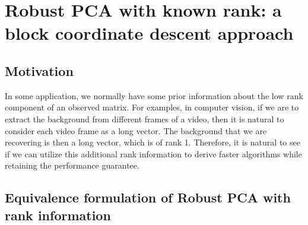 \newpage
\section{Robust PCA with known rank: a block coordinate descent approach}

\subsection{Motivation}
In some application, we normally have some prior information about the low rank component of an observed matrix. For examples, in computer vision, if we are to extract the background from different frames of a video, then it is natural to consider each video frame as a long vector. The background that we are recovering is then a long vector, which is of rank 1. Therefore, it is natural to see if we can utilize this additional rank information to derive faster algorithms while retaining the performance guarantee.



\subsection{Equivalence formulation of Robust PCA with rank information}

